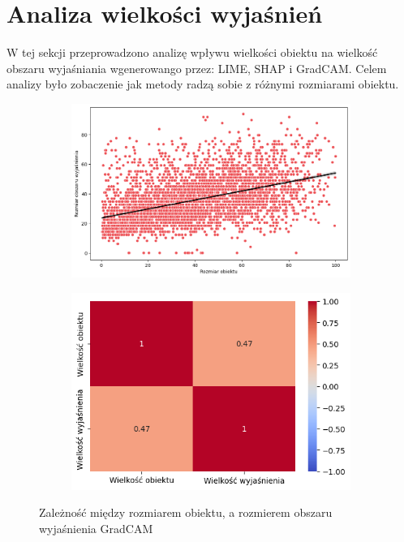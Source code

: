 \section*{Analiza wielkości wyjaśnień}

W tej sekcji przeprowadzono analizę wpływu wielkości obiektu na wielkość obszaru wyjaśniania wgenerowango przez: LIME, SHAP i GradCAM.
Celem analizy było zobaczenie jak metody radzą sobie z różnymi rozmiarami obiektu.

\begin{figure}[h]
	\centering
	\begin{subfigure}[b]{0.45\textwidth}
		\includegraphics[width=.9\textwidth]{img/size_exp_gradcam}
	\end{subfigure}
	\begin{subfigure}[b]{0.45\textwidth}
		\includegraphics[width=.9\textwidth]{img/size_exp_gradcam_corr}
	\end{subfigure}
	\caption{Zależność między rozmiarem obiektu, a rozmierem obszaru wyjaśnienia GradCAM}
	\label{rys:size_exp_gradcam}
\end{figure}
